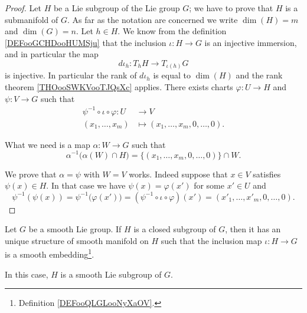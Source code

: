 \begin{proof}
    Let \( H\) be a Lie subgroup of the Lie group \( G\); we have to prove that \( H\) is a submanifold of \( G\). As far as the notation are concerned we write \( \dim(H)=m\) and \( \dim(G)=n\). Let \( h\in H\). We know from the definition \ref{DEFooGCHDooHUMSju} that the inclusion \( \iota\colon H\to G\) is an injective immersion, and in particular the map
    \begin{equation}
        d\iota_h\colon T_hH\to T_{\iota(h)}G
    \end{equation}
    is injective. In particular the rank of \( d\iota_h\) is equal to \( \dim(H)\) and the rank theorem \ref{THOooSWKVooTJQsXc} applies. There exists charts \( \varphi\colon U\to H\) and \( \psi\colon V\to G\) such that
    \begin{equation}
        \begin{aligned}
            \psi^{-1}\circ\iota\circ\varphi\colon U&\to V \\
            (x_1,\ldots, x_m)&\mapsto (x_1,\ldots, x_m,0,\ldots, 0). 
        \end{aligned}
    \end{equation}
    
    What we need is a map \( \alpha\colon W\to G\) such that
    \begin{equation}
        \alpha^{-1}\big( \alpha(W)\cap H \big)=\{ (x_1,\ldots, x_m,0,\ldots, 0) \}\cap W.
    \end{equation}
    
    We prove that \( \alpha=\psi\) with \( W=V\) works. Indeed suppose that \( x\in V\) satisfies \( \psi(x)\in H\). In that case we have \( \psi(x)=\varphi(x')\) for some \( x'\in U\) and
    \begin{equation}
            \psi^{-1}(\psi(x))=\psi^{-1}\big( \varphi(x') \big)=(\psi^{-1}\circ\iota\circ\varphi)(x')=(x'_1,\ldots, x'_m,0,\ldots, 0).
    \end{equation}
\end{proof}

\begin{theorem}     \label{THOooDEJHooVKJYBL}
    Let \( G\) be a smooth Lie group. If \( H\) is a closed subgroup of \( G\), then it has an unique structure of smooth manifold on \( H\) such that the inclusion map \( \iota\colon H\to G\) is a smooth embedding\footnote{Definition \ref{DEFooQLGLooNyXaOV}.}.

    In this case, \( H\) is a smooth Lie subgroup of \( G\).
\end{theorem}

